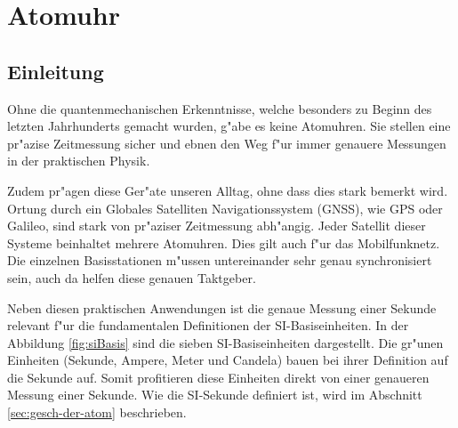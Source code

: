 \chapter{Atomuhr\label{chapter:atomuhr}}
\begin{refsection}

\section{Einleitung}
%

Ohne die quantenmechanischen Erkenntnisse, welche besonders zu Beginn
des letzten Jahrhunderts gemacht wurden, g"abe es keine Atomuhren.
Sie stellen eine pr"azise Zeitmessung sicher und ebnen den Weg f"ur
immer genauere Messungen in der praktischen Physik.

Zudem pr"agen diese Ger"ate unseren Alltag, ohne dass dies stark
bemerkt wird.  Ortung durch ein Globales Satelliten Navigationssystem
(GNSS), wie GPS oder Galileo, sind stark von pr"aziser Zeitmessung
abh"angig.  Jeder Satellit dieser Systeme beinhaltet mehrere
Atomuhren.  Dies gilt auch f"ur das Mobilfunknetz. Die einzelnen
Basisstationen m"ussen untereinander sehr genau synchronisiert sein,
auch da helfen diese genauen Taktgeber.

Neben diesen praktischen Anwendungen ist die genaue Messung einer
Sekunde relevant f"ur die fundamentalen Definitionen der
SI-Basiseinheiten. In der Abbildung \ref{fig:siBasis} sind die sieben
SI-Basis\-ein\-hei\-ten dargestellt.  Die gr"unen Einheiten (Sekunde,
Ampere, Meter und Candela) bauen bei ihrer Definition auf die Sekunde
auf.  Somit profitieren diese Einheiten direkt von einer genaueren
Messung einer Sekunde.  Wie die SI-Sekunde definiert ist, wird im
Abschnitt \ref{sec:gesch-der-atom} beschrieben.

\begin{figure}
  \centering
\end{figure}
\end{refsection}
